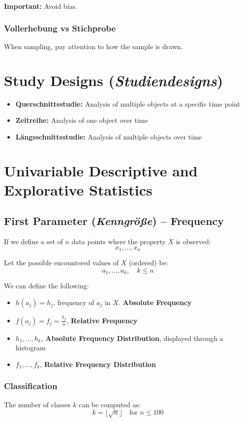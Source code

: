 \documentclass{article}
\begin{document}
\textbf{Important:} Avoid bias.

\subsubsection{Vollerhebung vs Stichprobe} When sampling, pay attention to how the sample is drawn.

\section{Study Designs (\textit{Studiendesigns})}
\begin{itemize}
  \item \textbf{Querschnittsstudie:} Analysis of multiple objects at a specific time point
  \item \textbf{Zeitreihe:} Analysis of one object over time
  \item \textbf{Längsschnittsstudie:} Analysis of multiple objects over time
\end{itemize}

\section{Univariable Descriptive and Explorative Statistics}
\subsection{First Parameter (\textit{Kenngröße}) -- Frequency}

If we define a set of $n$ data points where the property $X$ is observed:
\[
x_1, \dots, x_n
\]

Let the possible encountered values of $X$ (ordered) be:
\[
a_1, \dots, a_k, \quad k \leq n
\]

We can define the following:
\begin{itemize}
  \item $h(a_j) = h_j$, frequency of $a_j$ in $X$. \textbf{Absolute Frequency}
  \item $f(a_j) = f_j = \frac{h_j}{n}$, \textbf{Relative Frequency}
  \item $h_1, \dots, h_k$, \textbf{Absolute Frequency Distribution}, displayed through a histogram
  \item $f_1, \dots, f_k$, \textbf{Relative Frequency Distribution}
\end{itemize}

\subsubsection{Classification} The number of classes $k$ can be computed as:
\[
k = \lfloor \sqrt{n} \rfloor \quad \text{for } n \leq 100
\]
\end{document}
